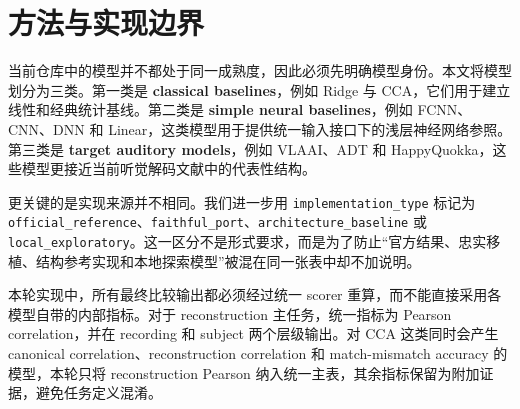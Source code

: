 \section{方法与实现边界}

当前仓库中的模型并不都处于同一成熟度，因此必须先明确模型身份。本文将模型划分为三类。第一类是 \textbf{classical baselines}，例如 Ridge 与 CCA，它们用于建立线性和经典统计基线。第二类是 \textbf{simple neural baselines}，例如 FCNN、CNN、DNN 和 Linear，这类模型用于提供统一输入接口下的浅层神经网络参照。第三类是 \textbf{target auditory models}，例如 VLAAI、ADT 和 HappyQuokka，这些模型更接近当前听觉解码文献中的代表性结构。

更关键的是实现来源并不相同。我们进一步用 \texttt{implementation\_type} 标记为 \texttt{official\_reference}、\texttt{faithful\_port}、\texttt{architecture\_baseline} 或 \texttt{local\_exploratory}。这一区分不是形式要求，而是为了防止“官方结果、忠实移植、结构参考实现和本地探索模型”被混在同一张表中却不加说明。

本轮实现中，所有最终比较输出都必须经过统一 scorer 重算，而不能直接采用各模型自带的内部指标。对于 reconstruction 主任务，统一指标为 Pearson correlation，并在 recording 和 subject 两个层级输出。对 CCA 这类同时会产生 canonical correlation、reconstruction correlation 和 match-mismatch accuracy 的模型，本轮只将 reconstruction Pearson 纳入统一主表，其余指标保留为附加证据，避免任务定义混淆。


